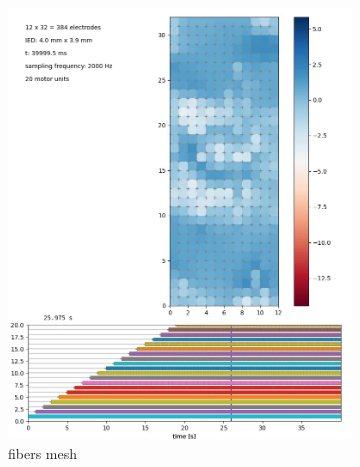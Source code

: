 \begin{figure}
  \centering%
  \begin{subfigure}[t]{0.6\textwidth}%
    \centering%
    \includegraphics[width=\textwidth]{images/results/application/emg_video_37.png}%
    \caption{fibers mesh}%
    \label{fig:emg_video_37}%
  \end{subfigure}  \,
  \begin{subfigure}[t]{0.38\textwidth}%
    \centering%

\end{subfigure}
\end{figure}
